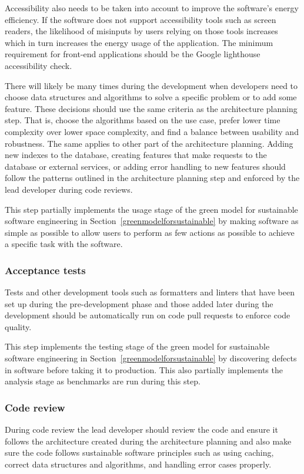 Accessibility also needs to be taken into account to improve the software's energy efficiency. If the software does not support accessibility tools such as screen readers, the likelihood of misinputs by users relying on those tools increases which in turn increases the energy usage of the application. The minimum requirement for front-end applications should be the Google lighthouse accessibility check.

There will likely be many times during the development when developers need to choose data structures and algorithms to solve a specific problem or to add some feature. These decisions should use the same criteria as the architecture planning step. That is, choose the algorithms based on the use case, prefer lower time complexity over lower space complexity, and find a balance between usability and robustness. The same applies to other part of the architecture planning. Adding new indexes to the database, creating features that make requests to the database or external services, or adding error handling to new features should follow the patterns outlined in the architecture planning step and enforced by the lead developer during code reviews.

This step partially implements the usage stage of the green model for sustainable software engineering in Section~\ref{greenmodelforsustainable} by making software as simple as possible to allow users to perform as few actions as possible to achieve a specific task with the software.

\subsubsection{Acceptance tests}
Tests and other development tools such as formatters and linters that have been set up during the pre-development phase and those added later during the development should be automatically run on code pull requests to enforce code quality.

This step implements the testing stage of the green model for sustainable software engineering in Section~\ref{greenmodelforsustainable} by discovering defects in software before taking it to production. This also partially implements the analysis stage as benchmarks are run during this step.

\subsubsection{Code review}
During code review the lead developer should review the code and ensure it follows the architecture created during the architecture planning and also make sure the code follows sustainable software principles such as using caching, correct data structures and algorithms, and handling error cases properly.

